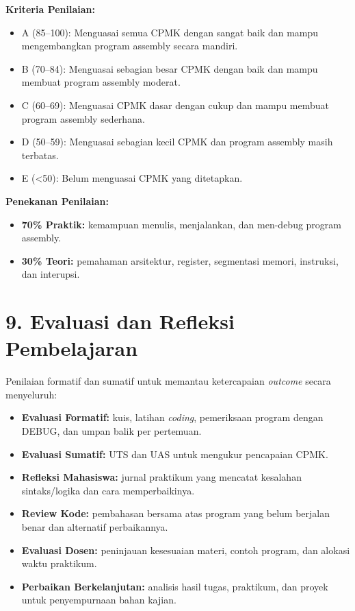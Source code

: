 \documentclass[12pt,a4paper]{article}
\begin{document}
\textbf{Kriteria Penilaian:}
\begin{itemize}[leftmargin=*]
  \item A (85--100): Menguasai semua CPMK dengan sangat baik dan mampu mengembangkan program assembly secara mandiri.
  \item B (70--84): Menguasai sebagian besar CPMK dengan baik dan mampu membuat program assembly moderat.
  \item C (60--69): Menguasai CPMK dasar dengan cukup dan mampu membuat program assembly sederhana.
  \item D (50--59): Menguasai sebagian kecil CPMK dan program assembly masih terbatas.
  \item E (<50): Belum menguasai CPMK yang ditetapkan.
\end{itemize}

\textbf{Penekanan Penilaian:}
\begin{itemize}[leftmargin=*]
  \item \textbf{70\% Praktik:} kemampuan menulis, menjalankan, dan men-debug program assembly.
  \item \textbf{30\% Teori:} pemahaman arsitektur, register, segmentasi memori, instruksi, dan interupsi.
\end{itemize}

\vspace{0.5cm}

\section*{9. Evaluasi dan Refleksi Pembelajaran}

Penilaian formatif dan sumatif untuk memantau ketercapaian \textit{outcome} secara menyeluruh:

\begin{itemize}[leftmargin=*]
  \item \textbf{Evaluasi Formatif:} kuis, latihan \textit{coding}, pemeriksaan program dengan DEBUG, dan umpan balik per pertemuan.
  \item \textbf{Evaluasi Sumatif:} UTS dan UAS untuk mengukur pencapaian CPMK.
  \item \textbf{Refleksi Mahasiswa:} jurnal praktikum yang mencatat kesalahan sintaks/logika dan cara memperbaikinya.
  \item \textbf{Review Kode:} pembahasan bersama atas program yang belum berjalan benar dan alternatif perbaikannya.
  \item \textbf{Evaluasi Dosen:} peninjauan kesesuaian materi, contoh program, dan alokasi waktu praktikum.
  \item \textbf{Perbaikan Berkelanjutan:} analisis hasil tugas, praktikum, dan proyek untuk penyempurnaan bahan kajian.
\end{itemize}
\end{document}
